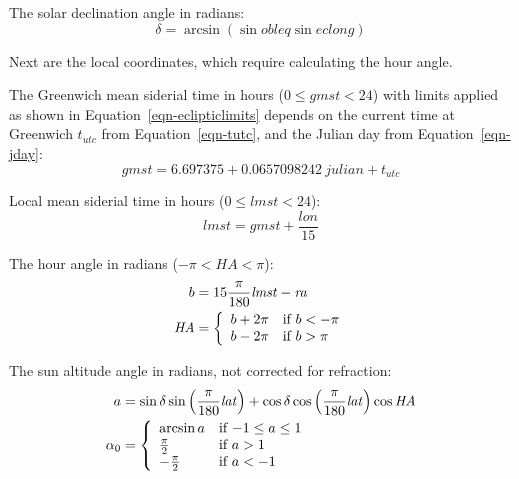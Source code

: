 \documentclass[12pt,letterpaper]{article}
\begin{document}
The solar declination angle in radians:
\begin{equation}\label{eqn-dec}
\delta = \arcsin \left( \sin \mathit{obleq} \sin \mathit{eclong} \right)
\end{equation}

Next are the local coordinates, which require calculating the hour angle. 

The Greenwich mean siderial time in hours ($0\leq\mathit{gmst}<24$) with limits applied as shown in Equation~\ref{eqn-eclipticlimits} depends on the current time at Greenwich $t_{utc}$ from Equation~\ref{eqn-tutc}, and the Julian day from Equation~\ref{eqn-jday}:
\begin{equation}
\mathit{gmst}= 6.697375 + 0.0657098242~\mathit{julian} + t_{\mathit{utc}}
\end{equation}

Local mean siderial time in hours ($0\leq\mathit{lmst}<24$):
\begin{equation}
\mathit{lmst}= \mathit{gmst} + \frac{\mathit{lon}}{15}
\end{equation}

The hour angle in radians ($-\pi<\mathit{HA}<\pi$):
\begin{align}
b &= 15\frac{\pi}{180}\mathit{lmst} -\mathit{ra}\notag\\
\mathit{HA}&= \left\{
  \begin{array}{ll}
  b + 2\pi & \text{if $b<-\pi$}\\
  b - 2\pi & \text{if $b>\pi$}
  \end{array}
\right.
\end{align}

The sun altitude angle in radians, not corrected for refraction:
\begin{align} \label{eqn-elv}
a &= \sin\delta \sin\left(\frac{\pi}{180}\mathit{lat}\right) + \cos\delta \cos\left(\frac{\pi}{180}\mathit{lat}\right) \cos\mathit{HA}\notag\\
\alpha_0 &=\left\{
  \begin{array}{ll}
    \arcsin a & \text{if $-1 \leq a \leq 1$}\\
    \frac{\pi}{2} & \text{if $a>1$}\\
    -\frac{\pi}{2} & \text{if $a<-1$}
  \end{array}
\right.
\end{align}
\end{document}
